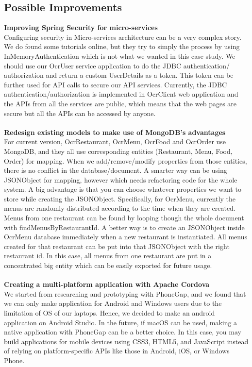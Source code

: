 \documentclass[12pt]{article}
\begin{document}
\begin{multicols}{2}

\subsection{Possible Improvements}
\noindent\textbf{Improving Spring Security for micro-services}
\\
Configuring security in Micro-services architecture can be a very complex story. We do found some tutorials online, but they try to simply the process by using InMemoryAuthentication which is not what we wanted in this case study. We should use our OcrUser service application to do the JDBC authentication/ authorization and return a custom UserDetails as a token. This token can be further used for API calls to secure our API services. Currently, the JDBC authentication/authorization is implemented in OcrClient web application and the APIs from all the services are public, which means that the web pages are secure but all the APIs can be accessed by anyone.
\\\\
\noindent\textbf{Redesign existing models to make use of MongoDB's advantages}
\\For current version, OcrRestaurant, OcrMenu, OcrFood and OcrOrder use MongoDB, and they all use corresponding entities (Restaurant, Menu, Food, Order) for mapping. When we add/remove/modify properties from those entities, there is no conflict in the database/document. A smarter way can be using JSONObject for mapping, however which needs refactoring code for the whole system. A big advantage is that you can choose whatever properties we want to store while creating the JSONObject.
Specifically, for OcrMenu, currently the menus are randomly distributed according to the time when they are created. Menus from one restaurant can be found by looping though the whole document with findMenusByRestaurantId. A better way is to create an JSONObject inside OcrMenu database immediately when a new restaurant is instantiated. All menus created for that restaurant can be put into that JSONObject with the right restaurant id. In this case, all menus from one restaurant are put in a concentrated big entity which can be easily exported for future usage. 
\\\\
\noindent\textbf{Creating a multi-platform application with Apache Cordova}
\\
We started from researching and prototyping with PhoneGap, and we found that we can only make application for Android and Windows users due to the limitation of OS of our laptops. Hence, we decided to make an android application on Android Studio. In the future, if macOS can be used, making a native application with PhoneGap can be a better choice. In this case, you may build applications for mobile devices using CSS3, HTML5, and JavaScript instead of relying on platform-specific APIs like those in Android, iOS, or Windows Phone.

\end{multicols}
\end{document}

